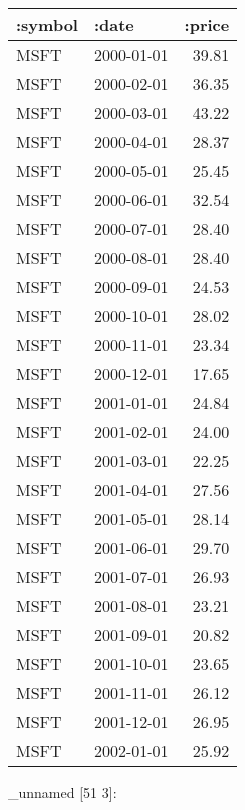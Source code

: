 \documentclass[]{article}
\newenvironment{Shaded}{\begin{snugshade}}{\end{snugshade}}
\newcommand{\KeywordTok}[1]{\textcolor[rgb]{0.13,0.29,0.53}{\textbf{#1}}}
\newcommand{\VariableTok}[1]{\textcolor[rgb]{0.00,0.00,0.00}{#1}}
\newcommand{\AttributeTok}[1]{\textcolor[rgb]{0.77,0.63,0.00}{#1}}
\newcommand{\NormalTok}[1]{#1}
\begin{document}
\begin{longtable}[]{@{}llr@{}}
\toprule
:symbol & :date & :price\tabularnewline
\midrule
\endhead
MSFT & 2000-01-01 & 39.81\tabularnewline
MSFT & 2000-02-01 & 36.35\tabularnewline
MSFT & 2000-03-01 & 43.22\tabularnewline
MSFT & 2000-04-01 & 28.37\tabularnewline
MSFT & 2000-05-01 & 25.45\tabularnewline
MSFT & 2000-06-01 & 32.54\tabularnewline
MSFT & 2000-07-01 & 28.40\tabularnewline
MSFT & 2000-08-01 & 28.40\tabularnewline
MSFT & 2000-09-01 & 24.53\tabularnewline
MSFT & 2000-10-01 & 28.02\tabularnewline
MSFT & 2000-11-01 & 23.34\tabularnewline
MSFT & 2000-12-01 & 17.65\tabularnewline
MSFT & 2001-01-01 & 24.84\tabularnewline
MSFT & 2001-02-01 & 24.00\tabularnewline
MSFT & 2001-03-01 & 22.25\tabularnewline
MSFT & 2001-04-01 & 27.56\tabularnewline
MSFT & 2001-05-01 & 28.14\tabularnewline
MSFT & 2001-06-01 & 29.70\tabularnewline
MSFT & 2001-07-01 & 26.93\tabularnewline
MSFT & 2001-08-01 & 23.21\tabularnewline
MSFT & 2001-09-01 & 20.82\tabularnewline
MSFT & 2001-10-01 & 23.65\tabularnewline
MSFT & 2001-11-01 & 26.12\tabularnewline
MSFT & 2001-12-01 & 26.95\tabularnewline
MSFT & 2002-01-01 & 25.92\tabularnewline
\bottomrule
\end{longtable}

\begin{Shaded}
\end{Shaded}

\_unnamed {[}51 3{]}:
\end{document}
